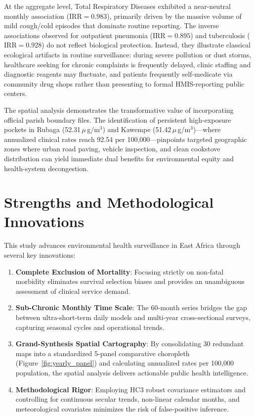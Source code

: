 \documentclass[12pt,a4paper]{report}
\newcommand{\ugm}{\ensuremath{\mu}\,g/m$^3$}
\begin{document}
At the aggregate level, Total Respiratory Diseases exhibited a near-neutral monthly association ($\mathrm{IRR} = 0.983$), primarily driven by the massive volume of mild cough/cold episodes that dominate routine reporting. The inverse associations observed for outpatient pneumonia ($\mathrm{IRR} = 0.895$) and tuberculosis ($\mathrm{IRR} = 0.928$) do not reflect biological protection. Instead, they illustrate classical ecological artifacts in routine surveillance: during severe pollution or dust storms, healthcare seeking for chronic complaints is frequently delayed, clinic staffing and diagnostic reagents may fluctuate, and patients frequently self-medicate via community drug shops rather than presenting to formal HMIS-reporting public centers.

The spatial analysis demonstrates the transformative value of incorporating official parish boundary files. The identification of persistent high-exposure pockets in Rubaga (52.31\,\ugm{}) and Kawempe (51.42\,\ugm{})---where annualized clinical rates reach 92.54 per 100,000---pinpoints targeted geographic zones where urban road paving, vehicle inspection, and clean cookstove distribution can yield immediate dual benefits for environmental equity and health-system decongestion.

\section{Strengths and Methodological Innovations}
This study advances environmental health surveillance in East Africa through several key innovations:
\begin{enumerate}
    \item \textbf{Complete Exclusion of Mortality}: Focusing strictly on non-fatal morbidity eliminates survival selection biases and provides an unambiguous assessment of clinical service demand.
    \item \textbf{Sub-Chronic Monthly Time Scale}: The 60-month series bridges the gap between ultra-short-term daily models and multi-year cross-sectional surveys, capturing seasonal cycles and operational trends.
    \item \textbf{Grand-Synthesis Spatial Cartography}: By consolidating 30 redundant maps into a standardized 5-panel comparative choropleth (Figure~\ref{fig:yearly_panel}) and calculating annualized rates per 100,000 population, the spatial analysis delivers actionable public health intelligence.
    \item \textbf{Methodological Rigor}: Employing HC3 robust covariance estimators and controlling for continuous secular trends, non-linear calendar months, and meteorological covariates minimizes the risk of false-positive inference.
\end{enumerate}
\end{document}
